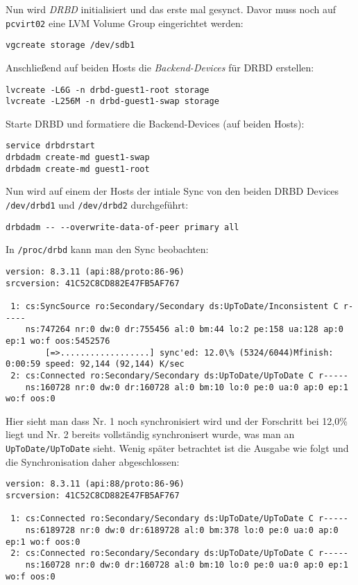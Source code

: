 Nun wird \emph{DRBD} initialisiert und das erste mal gesynct. Davor muss noch auf \verb#pcvirt02# eine LVM Volume Group eingerichtet werden:

\setupVerbatimOut
\begin{verbatim}
vgcreate storage /dev/sdb1 
\end{verbatim}

Anschließend auf beiden Hosts die \emph{Backend-Devices} für DRBD erstellen:
\setupVerbatimOut
\begin{verbatim}
lvcreate -L6G -n drbd-guest1-root storage
lvcreate -L256M -n drbd-guest1-swap storage
\end{verbatim}

Starte DRBD und formatiere die Backend-Devices (auf beiden Hosts):

\setupVerbatimOut
\begin{verbatim}
service drbdrstart
drbdadm create-md guest1-swap
drbdadm create-md guest1-root
\end{verbatim}


Nun wird auf einem der Hosts der intiale Sync von den beiden DRBD Devices \verb#/dev/drbd1# und \verb#/dev/drbd2# durchgeführt:

\setupVerbatimOut
\begin{verbatim}
drbdadm -- --overwrite-data-of-peer primary all
\end{verbatim}
In \verb#/proc/drbd# kann man den Sync beobachten:

\setupVerbatimOut
\begin{verbatim}
version: 8.3.11 (api:88/proto:86-96)
srcversion: 41C52C8CD882E47FB5AF767 

 1: cs:SyncSource ro:Secondary/Secondary ds:UpToDate/Inconsistent C r-----
    ns:747264 nr:0 dw:0 dr:755456 al:0 bm:44 lo:2 pe:158 ua:128 ap:0 ep:1 wo:f oos:5452576
        [=>..................] sync'ed: 12.0\% (5324/6044)Mfinish: 0:00:59 speed: 92,144 (92,144) K/sec
 2: cs:Connected ro:Secondary/Secondary ds:UpToDate/UpToDate C r-----
    ns:160728 nr:0 dw:0 dr:160728 al:0 bm:10 lo:0 pe:0 ua:0 ap:0 ep:1 wo:f oos:0
\end{verbatim}
Hier sieht man dass Nr. 1 noch synchronisiert wird und der  Forschritt bei 12,0\% liegt und  Nr. 2 bereits vollständig synchronisert wurde, was man an \verb#UpToDate/UpToDate# sieht.
Wenig später betrachtet ist die Ausgabe wie folgt und die Synchronisation daher abgeschlossen:

\setupVerbatimOut
\begin{verbatim}
version: 8.3.11 (api:88/proto:86-96)
srcversion: 41C52C8CD882E47FB5AF767 

 1: cs:Connected ro:Secondary/Secondary ds:UpToDate/UpToDate C r-----
    ns:6189728 nr:0 dw:0 dr:6189728 al:0 bm:378 lo:0 pe:0 ua:0 ap:0 ep:1 wo:f oos:0
 2: cs:Connected ro:Secondary/Secondary ds:UpToDate/UpToDate C r-----
    ns:160728 nr:0 dw:0 dr:160728 al:0 bm:10 lo:0 pe:0 ua:0 ap:0 ep:1 wo:f oos:0
\end{verbatim}

